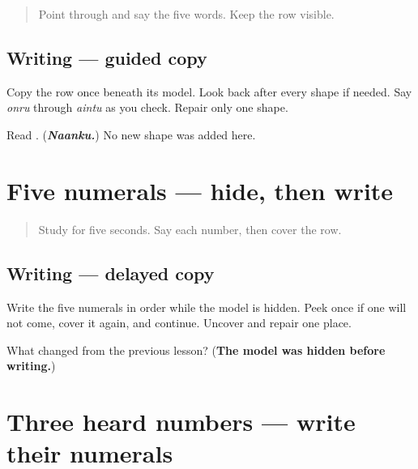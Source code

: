 \label{lesson:TA-W07-numbers-1-5-guided-copy}



\begin{quote}
Point through \textbf{    } and say the five words. Keep the row visible.
\end{quote}

\subsection*{Writing — guided copy}
Copy the row once beneath its model. Look back after every shape if needed. Say \emph{onru} through \emph{aintu} as you check. Repair only one shape.

\begin{tcolorbox}[breakable,colback=teal!4,colframe=teal!35!black,title={Before you move on}]
Read \textbf{}. (\emph{\textbf{Naanku.}}) No new shape was added here.
\end{tcolorbox}
\section[\texorpdfstring{\ta{௧} \ta{௨} \ta{௩} \ta{௪} \ta{௫} (one to five)}{௧ ௨ ௩ ௪ ௫ (one to five)}]{Five numerals — hide, then write}

\label{lesson:TA-W07-numbers-1-5-delayed-copy}



\begin{quote}
Study \textbf{    } for five seconds. Say each number, then cover the row.
\end{quote}

\subsection*{Writing — delayed copy}
Write the five numerals in order while the model is hidden. Peek once if one will not come, cover it again, and continue. Uncover and repair one place.

\begin{tcolorbox}[breakable,colback=teal!4,colframe=teal!35!black,title={Before you move on}]
What changed from the previous lesson? (\textbf{The model was hidden before writing.})
\end{tcolorbox}
\section[\texorpdfstring{\ta{௧} \ta{௨} \ta{௩} \ta{௪} \ta{௫} (one to five)}{௧ ௨ ௩ ௪ ௫ (one to five)}]{Three heard numbers — write their numerals}

